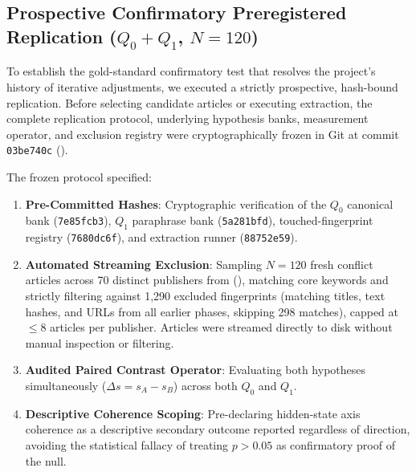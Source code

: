 \subsection{Prospective Confirmatory Preregistered Replication ($Q_0 + Q_1$, $N=120$)}
\label{sec:prospective_preregistered_results}

To establish the gold-standard confirmatory test that resolves the project's history of iterative adjustments, we executed a strictly prospective, hash-bound replication. Before selecting candidate articles or executing extraction, the complete replication protocol, underlying hypothesis banks, measurement operator, and exclusion registry were cryptographically frozen in Git at commit \texttt{03be740c} ().

The frozen protocol specified:
\begin{enumerate}
    \item \textbf{Pre-Committed Hashes}: Cryptographic verification of the $Q_0$ canonical bank (\texttt{7e85fcb3}), $Q_1$ paraphrase bank (\texttt{5a281bfd}), touched-fingerprint registry (\texttt{7680dc6f}), and extraction runner (\texttt{88752e59}).
    \item \textbf{Automated Streaming Exclusion}: Sampling $N=120$ fresh conflict articles across 70 distinct publishers from  (), matching core keywords and strictly filtering against 1,290 excluded fingerprints (matching titles, text hashes, and URLs from all earlier phases, skipping 298 matches), capped at $\le 8$ articles per publisher. Articles were streamed directly to disk without manual inspection or filtering.
    \item \textbf{Audited Paired Contrast Operator}: Evaluating both hypotheses simultaneously ($\Delta s = s_A - s_B$) across both $Q_0$ and $Q_1$.
    \item \textbf{Descriptive Coherence Scoping}: Pre-declaring hidden-state axis coherence as a descriptive secondary outcome reported regardless of direction, avoiding the statistical fallacy of treating $p > 0.05$ as confirmatory proof of the null.
\end{enumerate}

